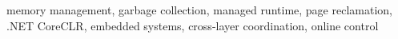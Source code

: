 memory management, garbage collection, managed runtime, page reclamation,
.NET CoreCLR, embedded systems, cross-layer coordination, online control
